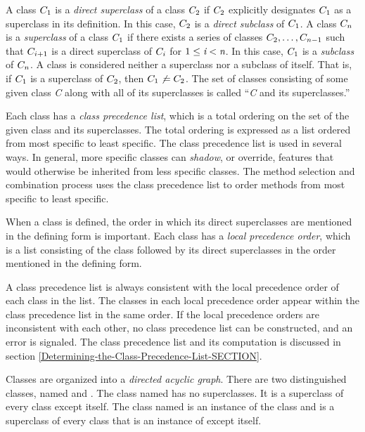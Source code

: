 A class $C_{1}$ is a \emph{direct superclass\/} of a class
$C_{2}$ if $C_{2}$ explicitly designates $C_{1}$ as a
superclass in its definition.  In this case, $C_{2}$ is a \emph{direct
  subclass\/} of $C_{1}$.  A class $C_{n}$ is a \emph{superclass\/} of a
class $C_{1}$ if there exists a series of 
classes $C_{2},\ldots,C_{n-1}$
such that $C_{i+1}$ is a
direct superclass of $C_{i}$ for $1 \leq \emph{i} < \emph{n}$.  In this case, 
$C_{1}$ is a \emph{subclass\/} of $C_{n}$.  A class is
considered neither a superclass nor a subclass of itself.  That is, if
$C_{1}$ is a superclass of $C_{2}$, then $C_{1} \not\,=
C_{2}$.  The set of classes consisting of some given
class \emph{C} along with all of its superclasses is called ``\emph{C} and its
superclasses.''

Each class has a \emph{class precedence list}, which is a total ordering
on the set of the given class and its superclasses.  The total ordering
is expressed as a list ordered from most specific to least specific.
The class precedence list is used in several ways.  In general, more
specific classes can \emph{shadow}, or override, features that would
otherwise be inherited from less specific classes.  The method selection
and combination process uses the class precedence list to order methods
from most specific to least specific. 
 
When a class is defined, the order in which its direct superclasses
are mentioned in the defining form is important.  Each class has a
\emph{local precedence order\/}, which is a list consisting of the
class followed by its direct superclasses in the order mentioned
in the defining form.

A class precedence list is always consistent with the local precedence
order of each class in the list.  The classes in each local precedence
order appear within the class precedence list in the same order.  If
the local precedence orders are inconsistent with each other, no class
precedence list can be constructed, and an error is signaled.
The class precedence list and its computation is discussed
in section \ref{Determining-the-Class-Precedence-List-SECTION}.

Classes are organized into a \emph{directed acyclic graph}.  There are
two distinguished classes, named  and .
The class named  has no superclasses.  It is a superclass of
every class except itself.  The class named  is
an instance of the class  and is a superclass of
every class that is an instance of  except itself.

